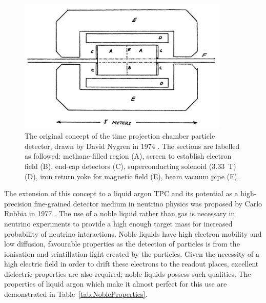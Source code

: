 \begin{figure}
  \centering
  \includegraphics[width=10cm]{NygrenTPC.png}
  \caption[The original concept of the time projection chamber particle detector, drawn by David Nygren in 1974.]{The original concept of the time projection chamber particle detector, drawn by David Nygren in 1974 \cite{Nygren1974}.  The sections are labelled as followed: methane-filled region (A), screen to establish electron field (B), end-cap detectors (C), superconducting solenoid (3.33~T) (D), iron return yoke for magnetic field (E), beam vacuum pipe (F).}
  \label{fig:NygrenTPC}
\end{figure}

The extension of this concept to a liquid argon TPC and its potential as a high-precision fine-grained detector medium in neutrino physics was proposed by Carlo Rubbia in 1977 \cite{Rubbia1977}.  The use of a noble liquid rather than gas is necessary in neutrino experiments to provide a high enough target mass for increased probability of neutrino interactions.  Noble liquids have high electron mobility and low diffusion, favourable properties as the detection of particles is from the ionisation and scintillation light created by the particles.  Given the necessity of a high electric field in order to drift these electrons to the readout places, excellent dielectric properties are also required; noble liquids possess such qualities.  The properties of liquid argon which make it almost perfect for this use are demonstrated in Table~\ref{tab:NobleProperties}.

